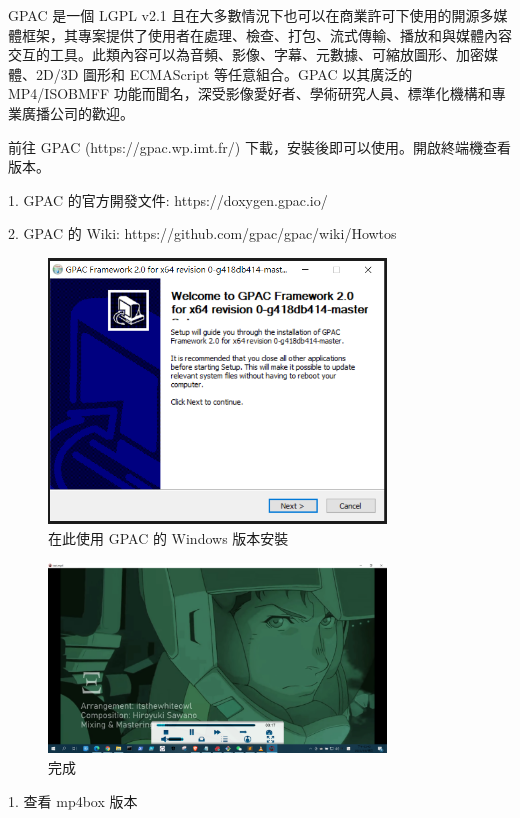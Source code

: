 \documentclass[10pt,UTF8]{ctexart}
\begin{document}
GPAC 是一個 LGPL v2.1 且在大多數情況下也可以在商業許可下使用的開源多媒體框架，其專案提供了使用者在處理、檢查、打包、流式傳輸、播放和與媒體內容交互的工具。此類內容可以為音頻、影像、字幕、元數據、可縮放圖形、加密媒體、2D/3D 圖形和 ECMAScript 等任意組合。GPAC 以其廣泛的 MP4/ISOBMFF 功能而聞名，深受影像愛好者、學術研究人員、標準化機構和專業廣播公司的歡迎。

前往 GPAC (https://gpac.wp.imt.fr/) 下載，安裝後即可以使用。開啟終端機查看版本。

1. GPAC 的官方開發文件: https://doxygen.gpac.io/

2. GPAC 的 Wiki: https://github.com/gpac/gpac/wiki/Howtos

\begin{figure}[H]
\centering 
\includegraphics[width=0.80\textwidth]{g1.png} 
\caption{在此使用 GPAC 的 Windows 版本安裝}
\label{Test}
\end{figure}

\begin{figure}[H]
\centering 
\includegraphics[width=0.80\textwidth]{g2.png} 
\caption{完成}
\label{Test}
\end{figure}

1. 查看 mp4box 版本
\end{document}
